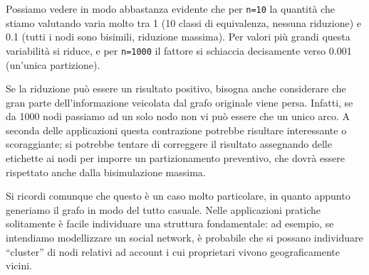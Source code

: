 Possiamo vedere in modo abbastanza evidente che per \verb|n=10| la quantità che stiamo valutando varia molto tra 1 (10 classi di equivalenza, nessuna riduzione) e 0.1 (tutti i nodi sono bisimili, riduzione massima). Per valori più grandi questa variabilità si riduce, e per \verb|n=1000| il fattore si schiaccia decisamente verso 0.001 (un'unica partizione).

Se la riduzione può essere un risultato positivo, bisogna anche considerare che gran parte dell'informazione veicolata dal grafo originale viene persa. Infatti, se da 1000 nodi passiamo ad un solo nodo non vi può essere che un unico arco. A seconda delle applicazioni questa contrazione potrebbe risultare interessante o scoraggiante; si potrebbe tentare di correggere il risultato assegnando delle etichette ai nodi per imporre un partizionamento preventivo, che dovrà essere rispettato anche dalla bisimulazione massima.

Si ricordi comunque che questo è un caso molto particolare, in quanto appunto generiamo il grafo in modo del tutto casuale. Nelle applicazioni pratiche solitamente è facile individuare una struttura fondamentale: ad esempio, se intendiamo modellizzare un social network, è probabile che si possano individuare ``cluster'' di nodi relativi ad account i cui proprietari vivono geograficamente vicini.
